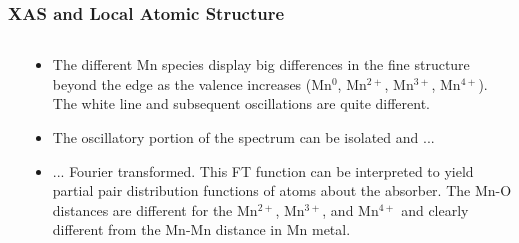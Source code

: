 \documentclass[10pt, xcolor=x11names, compress]{beamer}
\begin{document}
\begin{frame}
  \frametitle{XAS and Local Atomic Structure}
  \begin{columns}[T]
    \begin{column}{0.34\linewidth}


    \end{column}
    \begin{column}{0.66\linewidth}
      \begin{itemize}[<+->]
      \item The different Mn species display big differences in the
        fine structure beyond the edge as the valence increases
        ({\color{Blue3}Mn$^0$}, \alert{Mn$^{2+}$},
        {\color{Green4}Mn$^{3+}$}, {\color{Purple3}Mn$^{4+}$}).  The
        white line and subsequent oscillations are quite
        different.\\[6ex]
      \item The oscillatory portion of the spectrum can be isolated
        and ...\\[6ex]
      \item ... Fourier transformed.  This FT function can be
        interpreted to yield partial pair distribution functions of
        atoms about the absorber.  The Mn-O distances are different
        for the \alert{Mn$^{2+}$}, {\color{Green4}Mn$^{3+}$}, and
        {\color{Purple3}Mn$^{4+}$} and clearly different from the
        Mn-Mn distance in {\color{Blue3}Mn metal}.
      \end{itemize}
    \end{column}
  \end{columns}
\end{frame}
\end{document}
